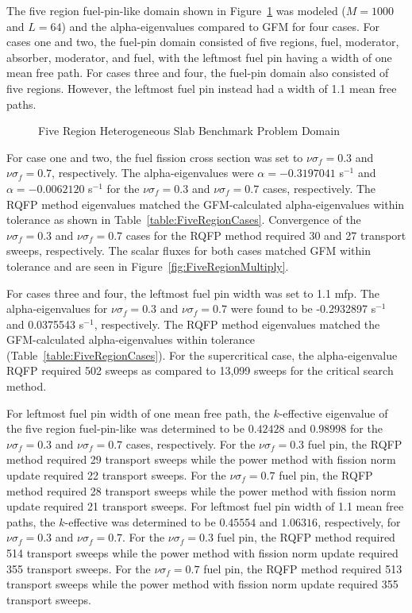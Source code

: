 The five region fuel-pin-like domain shown in Figure~\ref{fig:FiveRegionProblem} was modeled ($M=1000$ and $L=64$) and the alpha-eigenvalues compared to GFM for four cases. For cases one and two, the fuel-pin domain consisted of five regions, fuel, moderator, absorber, moderator, and fuel, with the leftmost fuel pin having a width of one mean free path. For cases three and four, the fuel-pin domain also consisted of five regions. However, the leftmost fuel pin instead had a width of 1.1 mean free paths.

\begin{figure}[H]
	\centering
	\resizebox{0.75\textwidth}{!}{}
	\caption{Five Region Heterogeneous Slab Benchmark Problem Domain}
	\label{fig:FiveRegionProblem}
\end{figure}

For case one and two, the fuel fission cross section was set to $\nu \sigma_{f} = 0.3$ and $\nu \sigma_{f} = 0.7$, respectively. The alpha-eigenvalues were $\alpha = -0.3197041$ s$^{-1}$ and $\alpha = -0.0062120$ s$^{-1}$ for the $\nu \sigma_{f} = 0.3$ and $\nu \sigma_{f} = 0.7$ cases, respectively. The RQFP method eigenvalues matched the GFM-calculated alpha-eigenvalues within tolerance as shown in Table~\ref{table:FiveRegionCases}. Convergence of the $\nu \sigma_{f} = 0.3$ and $\nu \sigma_{f} = 0.7$ cases for the RQFP method required 30 and 27 transport sweeps, respectively. The scalar fluxes for both cases matched GFM within tolerance and are seen in Figure~\ref{fig:FiveRegionMultiply}. 

For cases three and four, the leftmost fuel pin width was set to 1.1 mfp. The alpha-eigenvalues for $\nu \sigma_{f} = 0.3$ and $\nu \sigma_{f} = 0.7$ were found to be -0.2932897 s$^{-1}$ and 0.0375543 s$^{-1}$, respectively. The RQFP method eigenvalues matched the GFM-calculated alpha-eigenvalues within tolerance (Table~\ref{table:FiveRegionCases}). For the supercritical case, the alpha-eigenvalue RQFP required 502 sweeps as compared to 13,099 sweeps for the critical search method.

For leftmost fuel pin width of one mean free path, the $k$-effective eigenvalue of the five region fuel-pin-like was determined to be $0.42428$ and $0.98998$ for the $\nu \sigma_{f} = 0.3$ and $\nu \sigma_{f} = 0.7$ cases, respectively. For the $\nu \sigma_{f} = 0.3$ fuel pin, the RQFP method required 29 transport sweeps while the power method with fission norm update required 22 transport sweeps. For the $\nu \sigma_{f} = 0.7$ fuel pin, the RQFP method required 28 transport sweeps while the power method with fission norm update required 21 transport sweeps. For leftmost fuel pin width of 1.1 mean free paths, the $k$-effective was determined to be $0.45554$ and $1.06316$, respectively, for  $\nu \sigma_{f} = 0.3$ and $\nu \sigma_{f} = 0.7$. For the $\nu \sigma_{f} = 0.3$ fuel pin, the RQFP method required 514 transport sweeps while the power method with fission norm update required 355 transport sweeps. For the $\nu \sigma_{f} = 0.7$ fuel pin, the RQFP method required 513 transport sweeps while the power method with fission norm update required 355 transport sweeps.

